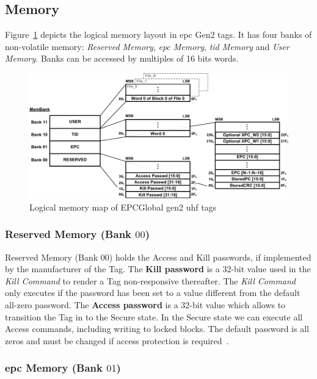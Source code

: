 \subsection{Memory}

Figure~\ref{fig:logicalmemorymap} depicts the logical memory layout in \ac{epc} Gen2 tags. It has four banks of non-volatile memory: \emph{Reserved Memory}, \emph{\ac{epc} Memory}, \emph{\ac{tid} Memory} and \emph{User Memory}. Banks can be accessed by multiples of 16 bits words.

\begin{figure}[!ht]
    \centering
    \includegraphics[width=\textwidth]{./figs/02-state-of-the-art/logicmemorymap.pdf}
    \caption{Logical memory map of EPCGlobal \ac{gen2} \ac{uhf} tags~\cite{UHFGen2Tag}} 
    \label{fig:logicalmemorymap}
\end{figure}

\subsubsection{Reserved Memory (Bank $00$)}

Reserved Memory (Bank $00$) holds the Access and Kill passwords, if implemented by the manufacturer of the Tag. 
The \textbf{Kill password} is a 32-bit value used in the \textit{Kill Command} to render a Tag non-responsive thereafter. The \textit{Kill Command} only executes if the password has been set to a value different from the default all-zero password. 
The \textbf{Access password} is a 32-bit value which allows to transition the Tag in to the Secure state. In the Secure state we can execute all Access commands, including writing to locked blocks. The default password is all zeros and must be changed if access protection is required~\cite{RFIDEPCGen2,UHFGen2Tag}.

\subsubsection{\ac{epc} Memory (Bank $01$)}

